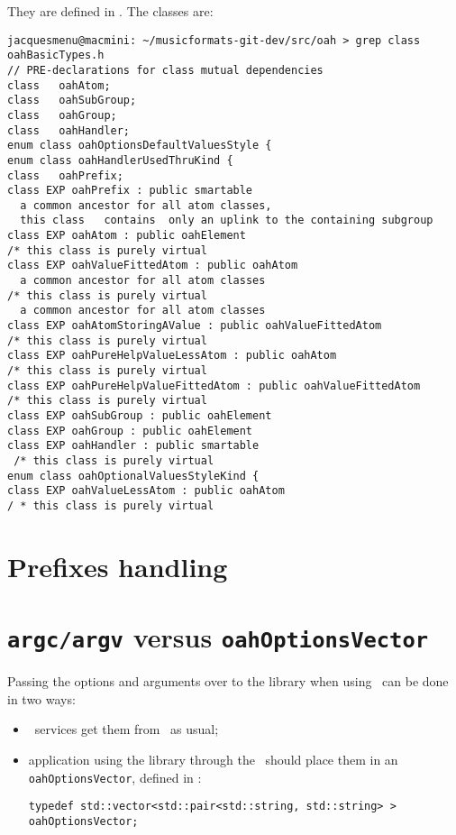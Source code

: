 They are defined in . The classes are:
\begin{lstlisting}[language=Terminal]
jacquesmenu@macmini: ~/musicformats-git-dev/src/oah > grep class   oahBasicTypes.h
// PRE-declarations for class mutual dependencies
class   oahAtom;
class   oahSubGroup;
class   oahGroup;
class   oahHandler;
enum class oahOptionsDefaultValuesStyle {
enum class oahHandlerUsedThruKind {
class   oahPrefix;
class EXP oahPrefix : public smartable
  a common ancestor for all atom classes,
  this class   contains  only an uplink to the containing subgroup
class EXP oahAtom : public oahElement
/* this class is purely virtual
class EXP oahValueFittedAtom : public oahAtom
  a common ancestor for all atom classes
/* this class is purely virtual
  a common ancestor for all atom classes
class EXP oahAtomStoringAValue : public oahValueFittedAtom
/* this class is purely virtual
class EXP oahPureHelpValueLessAtom : public oahAtom
/* this class is purely virtual
class EXP oahPureHelpValueFittedAtom : public oahValueFittedAtom
/* this class is purely virtual
class EXP oahSubGroup : public oahElement
class EXP oahGroup : public oahElement
class EXP oahHandler : public smartable
 /* this class is purely virtual
enum class oahOptionalValuesStyleKind {
class EXP oahValueLessAtom : public oahAtom
/ * this class is purely virtual
\end{lstlisting}


\section{Prefixes handling}


\section{{\tt argc/argv} versus {\tt oahOptionsVector}}

Passing the options and arguments over to the library when using \mf\ can be done in two ways:
\begin{itemize}
\item \CLI\ services get them from \argcargv\ as usual;
\item application using the library through the \API\ should place them in an {\tt oahOptionsVector}, defined in :
\begin{lstlisting}[language=CPlusPlus]
typedef std::vector<std::pair<std::string, std::string> > oahOptionsVector;
\end{lstlisting}

\end{itemize}

